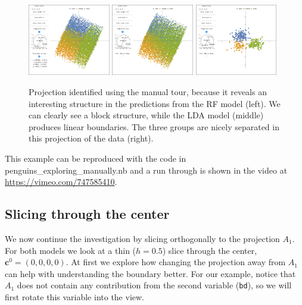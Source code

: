 \documentclass[]{interact}
\theoremstyle{plain}%
\theoremstyle{definition}
\theoremstyle{remark}
\begin{document}
\begin{figure}[ht]
\centerline{\includegraphics[width=0.32\textwidth]{figures/proj1_rf.png}
\includegraphics[width=0.32\textwidth]{figures/proj1_lda.png}
\includegraphics[width=0.32\textwidth]{figures/proj1_data.png}}
\caption{Projection identified using the manual tour, because it reveals an interesting structure in the predictions from the RF model (left). We can clearly see a block structure, while the LDA model (middle) produces linear boundaries. The three groups are nicely separated in this projection of the data (right).}
\label{proj1}
\end{figure}

This example can be reproduced with the code in
penguins\_exploring\_manually.nb and a run through is shown in the video
at \url{https://vimeo.com/747585410}.

\hypertarget{slicing-through-the-center}{%
\subsection{Slicing through the
center}\label{slicing-through-the-center}}

We now continue the investigation by slicing orthogonally to the
projection \(A_1\). For both models we look at a thin (\(h=0.5\)) slice
through the center, \(\mathbf{c}^0 = (0,0,0,0)\). At first we explore
how changing the projection away from \(A_1\) can help with
understanding the boundary better. For our example, notice that \(A_1\)
does not contain any contribution from the second variable
(\texttt{bd}), so we will first rotate this variable into the view.
\end{document}
